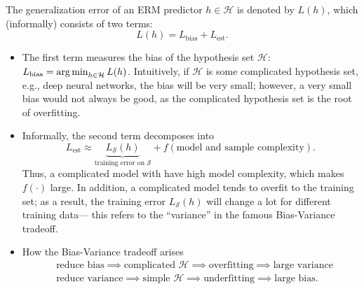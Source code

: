 The generalization error of an ERM predictor $h \in \mathcal{H}$ is denoted by $L(h)$, which (informally) consists of two terms:
    \begin{equation}
        L(h) = L_\text{bias} + L_\text{est}.
    \end{equation}
\begin{itemize}
    \item The first term measures the bias of the hypothesis set $\mathcal{H}$: $L_\text{bias} = \operatorname{arg\,min}_{h \in \mathcal{H}} L(h)$.
          Intuitively, if $\mathcal{H}$ is some complicated hypothesis set, e.g., deep neural networks, the bias will be very small; however, a very small bias would not always be good, as the complicated hypothesis set is the root of overfitting.
          
    \item Informally, the second term decomposes into
        \begin{equation}
            L_\text{est} \approx \underbrace{L_{\mathcal{S}}(h)}_{\text{training error on $\mathcal{S}$}} + f(\text{model and sample complexity}).
        \end{equation}
    Thus, a complicated model with have high model complexity, which makes $f(\cdot)$ large.
    In addition, a complicated model tends to overfit to the training set; as a result, the training error $L_\mathcal{S}(h)$ will change a lot for different training data--- this refers to the ``variance'' in the famous Bias-Variance tradeoff.
    
    \item How the Bias-Variance tradeoff arises
        \begin{equation}
            \begin{aligned}
                    & \text{reduce bias} \implies \text{complicated $\mathcal{H}$} \implies \text{overfitting} \implies \text{large variance} \\
                    & \text{reduce variance} \implies \text{simple $\mathcal{H}$}   \implies \text{underfitting} \implies \text{large bias}.
            \end{aligned}
        \end{equation}
\end{itemize}

